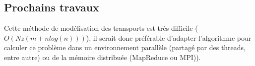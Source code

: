 

\subsection{Prochains travaux}



Cette méthode de modélisation des transports est très difficile ($O(N z (m + n log(n)))$), il serait donc préférable d'adapter l'algorithme pour calculer ce problème dans un environnement parallèle (partagé par des threads, entre autre) ou de la mémoire distribuée (MapReduce ou MPI)).

